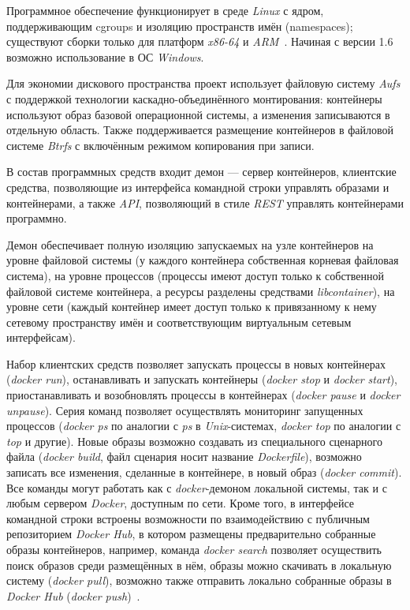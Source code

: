 Программное обеспечение функционирует в среде \textit{Linux} с ядром, поддерживающим cgroups и изоляцию пространств имён (namespaces); существуют сборки только для платформ \textit{x86-64} и \textit{ARM}~\cite{docker}. Начиная с версии 1.6 возможно использование в ОС \textit{Windows}.

Для экономии дискового пространства проект использует файловую систему \textit{Aufs} с поддержкой технологии каскадно-объединённого монтирования: контейнеры используют образ базовой операционной системы, а изменения записываются в отдельную область. Также поддерживается размещение контейнеров в файловой системе \textit{Btrfs} с включённым режимом копирования при записи.

В состав программных средств входит демон — сервер контейнеров, клиентские средства, позволяющие из интерфейса командной строки управлять образами и контейнерами, а также \textit{API}, позволяющий в стиле \textit{REST} управлять контейнерами программно.

Демон обеспечивает полную изоляцию запускаемых на узле контейнеров на уровне файловой системы (у каждого контейнера собственная корневая файловая система), на уровне процессов (процессы имеют доступ только к собственной файловой системе контейнера, а ресурсы разделены средствами \textit{libcontainer}), на уровне сети (каждый контейнер имеет доступ только к привязанному к нему сетевому пространству имён и соответствующим виртуальным сетевым интерфейсам).

Набор клиентских средств позволяет запускать процессы в новых контейнерах (\textit{docker run}), останавливать и запускать контейнеры (\textit{docker stop} и \textit{docker start}), приостанавливать и возобновлять процессы в контейнерах (\textit{docker pause} и \textit{docker unpause}). Серия команд позволяет осуществлять мониторинг запущенных процессов (\textit{docker ps} по аналогии с \textit{ps} в \textit{Unix}-системах, \textit{docker top} по аналогии с \textit{top} и другие). Новые образы возможно создавать из специального сценарного файла (\textit{docker build}, файл сценария носит название \textit{Dockerfile}), возможно записать все изменения, сделанные в контейнере, в новый образ (\textit{docker commit}). Все команды могут работать как с \textit{docker}-демоном локальной системы, так и с любым сервером \textit{Docker}, доступным по сети. Кроме того, в интерфейсе командной строки встроены возможности по взаимодействию с публичным репозиторием \textit{Docker Hub}, в котором размещены предварительно собранные образы контейнеров, например, команда \textit{docker search} позволяет осуществить поиск образов среди размещённых в нём, образы можно скачивать в локальную систему (\textit{docker pull}), возможно также отправить локально собранные образы в \textit{Docker Hub} (\textit{docker push})~\cite{docker}.

